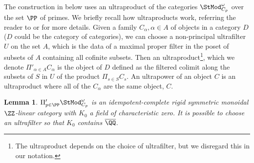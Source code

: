 \documentclass[12pt,oneside]{article}
\newcounter{counter}
\newtheorem{lem}[counter]{Lemma}
\begin{document}
	The construction in  below uses an ultraproduct of the categories $\StMod^{\omega}_{C_p}$ over the set $\PP$ of primes. We briefly recall how ultraproducts work, referring the reader to \cite[Section 3]{barthel2020chromatic} or \cite[Section 3.6]{etingof2021lectures} for more details. Given a family $C_{\alpha}, \alpha \in A$ of objects in a category $D$ ($D$ could be the category of categories), we can choose a non-principal ultrafilter $U$ on the set $A$, which is the data of a maximal proper filter in the poset of subsets of $A$ containing all cofinite subsets. Then an ultraproduct\footnote{The ultraproduct depends on the choice of ultrafilter, but we disregard this in our notation.}, which we denote $\Pi'_{\alpha \in A}C_{\alpha}$ is the object of $D$ defined as the filtered colimit along the subsets of $S$ in $U$ of the product $\Pi_{s \in S}C_{s}$. An ultrapower of an object $C$ is an ultraproduct where all of the $C_{\alpha}$ are the same object, $C$.
	
	\begin{lem}\label{thm:k0char0}
		$\Pi'_{p \in \PP} \StMod^{\omega}_{C_p}$ is an idempotent-complete rigid symmetric monoidal $\ZZ$-linear category with $K_0$ a field of characteristic zero. It is possible to choose an ultrafilter so that $K_0$ contains $\overline{\QQ}$.
	\end{lem}
\end{document}
